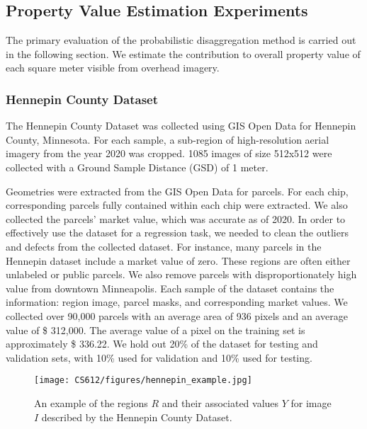 \documentclass[10pt,twocolumn,letterpaper]{article}
\begin{document}
\subsection{Property Value Estimation Experiments}

The primary evaluation of the probabilistic disaggregation method is carried out in the following section. We estimate the contribution to overall property value of each square meter visible from overhead imagery.

\subsubsection{Hennepin County Dataset}
The Hennepin County Dataset was collected using GIS Open Data for Hennepin County, Minnesota. For each sample, a sub-region of high-resolution aerial imagery from the year 2020 was cropped. 1085 images of size 512x512 were collected with a Ground Sample Distance (GSD) of 1 meter. 

Geometries were extracted from the GIS Open Data for parcels. For each chip, corresponding parcels fully contained within each chip were extracted. We also collected the parcels' market value, which was accurate as of 2020. In order to effectively use the dataset for a regression task, we needed to clean the outliers and defects from the collected dataset. For instance, many parcels in the Hennepin dataset include a market value of zero. These regions are often either unlabeled or public parcels. We also remove parcels with disproportionately high value from downtown Minneapolis. Each sample of the dataset contains the information: region image, parcel masks, and corresponding market values. We collected over 90,000 parcels with an average area of 936 pixels and an average value of \$ 312,000. The average value of a pixel on the training set is approximately \$ 336.22. We hold out 20\% of the dataset for testing and validation sets, with 10\% used for validation and 10\% used for testing. 


\begin{figure}[t]
        \centering
        \texttt{[image: CS612/figures/hennepin\_example.jpg]}
        \caption{ An example of the regions $R$ and their associated values $Y$ for image $I$  described by the Hennepin County Dataset.}
        \label{fig:dataset_examples}
\end{figure}
\end{document}
